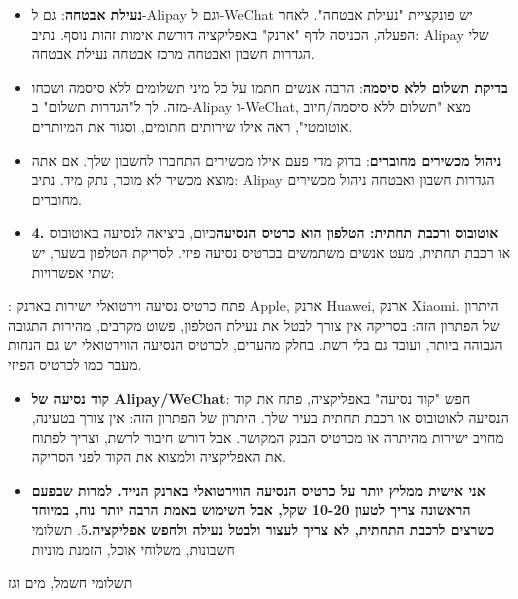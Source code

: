 \begin{itemize}
  \item \textbf{נעילת אבטחה}: גם ל-Alipay וגם ל-WeChat יש פונקציית "נעילת אבטחה". לאחר הפעלה, הכניסה לדף "ארנק" באפליקציה דורשת אימות זהות נוסף. נתיב: Alipay שלי הגדרות חשבון ואבטחה מרכז אבטחה נעילת אבטחה.
  \item \textbf{בדיקת תשלום ללא סיסמה}: הרבה אנשים חתמו על כל מיני תשלומים ללא סיסמה ושכחו מזה. לך ל"הגדרות תשלום" ב-Alipay ו-WeChat, מצא "תשלום ללא סיסמה/חיוב אוטומטי", ראה אילו שירותים חתומים, וסגור את המיותרים.
  \item \textbf{ניהול מכשירים מחוברים}: בדוק מדי פעם אילו מכשירים התחברו לחשבון שלך. אם אתה מוצא מכשיר לא מוכר, נתק מיד. נתיב: Alipay הגדרות חשבון ואבטחה ניהול מכשירים מחוברים.
  \item \textbf{4. אוטובוס ורכבת תחתית: הטלפון הוא כרטיס הנסיעה}כיום, ביציאה לנסיעה באוטובוס או רכבת תחתית, מעט אנשים משתמשים בכרטיס נסיעה פיזי. לסריקת הטלפון בשער, יש שתי אפשרויות:
\end{itemize}


: פתח כרטיס נסיעה וירטואלי ישירות בארנק Apple, ארנק Huawei, ארנק Xiaomi. היתרון של הפתרון הזה: בסריקה אין צורך לבטל את נעילת הטלפון, פשוט מקרבים, מהירות התגובה הגבוהה ביותר, ועובד גם בלי רשת. בחלק מהערים, לכרטיס הנסיעה הווירטואלי יש גם הנחות מעבר כמו לכרטיס הפיזי.

\begin{itemize}
  \item \textbf{קוד נסיעה של Alipay/WeChat}: חפש "קוד נסיעה" באפליקציה, פתח את קוד הנסיעה לאוטובוס או רכבת תחתית בעיר שלך. היתרון של הפתרון הזה: אין צורך בטעינה, מחויב ישירות מהיתרה או מכרטיס הבנק המקושר. אבל דורש חיבור לרשת, וצריך לפתוח את האפליקציה ולמצוא את הקוד לפני הסריקה.
  \item \textbf{אני אישית ממליץ יותר על כרטיס הנסיעה הווירטואלי בארנק הנייד. למרות שבפעם הראשונה צריך לטעון 10-20 שקל, אבל השימוש באמת הרבה יותר נוח, במיוחד כשרצים לרכבת התחתית, לא צריך לעצור ולבטל נעילה ולחפש אפליקציה.}5. תשלומי חשבונות, משלוחי אוכל, הזמנת מוניות
\end{itemize}

תשלומי חשמל, מים וגז


